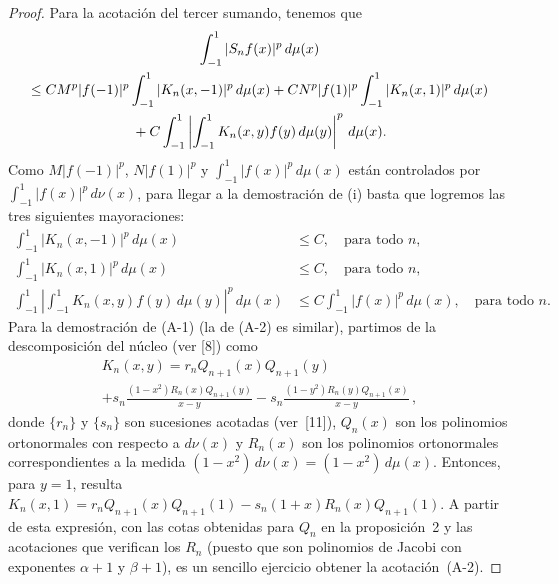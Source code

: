 \documentclass[a4paper,12pt]{article}
\theoremstyle{plain}
\theoremstyle{definition}
\begin{document}
\begin{proof}
Para la acotaci\'on del tercer sumando, tenemos que
\begin{multline*}
\int_{-1}^1 |S_{n}f(x)|^{p}\,d\mu(x) \\
\leq C M^{p}|f(-1)|^{p} \int_{-1}^1 |K_{n}(x,-1)|^{p}\,d\mu(x)
+ C N^{p}|f(1)|^{p} \int_{-1}^1 |K_{n}(x,1)|^{p}\,d\mu(x) \\
\null+ C \int_{-1}^1 \left| \int_{-1}^1 K_{n}(x,y)f(y)\,d\mu(y) \right|^{p}
\,d\mu(x).
\end{multline*}
\sloppy Como $M |f(-1)|^{p}$, $N |f(1)|^{p}$ y
$\int_{-1}^1 |f(x)|^{p}\,d\mu(x)$ est\'an controlados
por $\int_{-1}^1 |f(x)|^{p}\,d\nu(x)$, para llegar
a la demostraci\'on de (i) basta que logremos las tres siguientes
mayoraciones:
\begin{align}
\int_{-1}^1 |K_{n}(x,-1)|^{p}\,d\mu(x) &\leq C,
\quad\text{para todo } n,
\tag{A-1}\\
\int_{-1}^1 |K_{n}(x,1)|^{p}\,d\mu(x) &\leq C,
\quad\text{para todo } n,
\tag{A-2}\\
\int_{-1}^1 \left| \int_{-1}^1 K_{n}(x,y)f(y)\,d\mu(y) \right|^{p}\,d\mu(x)
&\leq C \int_{-1}^1 |f(x)|^{p}\,d\mu(x),
\quad\text{para todo } n.
\tag{A-3}
\end{align}
Para la demostraci\'on de (A-1) (la de (A-2) es similar), partimos
de la descomposici\'on del n\'ucleo (ver [8]) como
\begin{multline*}
K_{n}(x,y) = r_{n}Q_{n+1}(x)Q_{n+1}(y) \\
+ s_{n} \frac{(1-x^{2})R_{n}(x)Q_{n+1}(y)}{x-y}
- s_{n} \frac{(1-y^{2})R_{n}(y)Q_{n+1}(x)}{x-y}\,,
\end{multline*}
donde $\{r_{n}\}$ y $\{s_{n}\}$ son sucesiones acotadas (ver~[11]),
$Q_{n}(x)$ son los polinomios ortonormales con respecto a $d\nu(x)$
y $R_{n}(x)$ son los polinomios ortonormales correspondientes a
la medida $(1-x^{2})\,d\nu(x) = (1-x^{2})\,d\mu(x)$. Entonces,
para $y = 1$, resulta
$K_{n}(x,1) = r_{n}Q_{n+1}(x)Q_{n+1}(1) - s_{n}(1+x)R_{n}(x)Q_{n+1}(1)$.
A partir de esta expresi\'on, con las cotas obtenidas para $Q_{n}$
en la proposici\'on~2 y las acotaciones que verifican los $R_{n}$
(puesto que son polinomios de Jacobi con exponentes $\alpha+1$
y $\beta+1$), es un sencillo ejercicio obtener la aco\-ta\-ci\'on~(A-2).


\end{proof}
\end{document}
